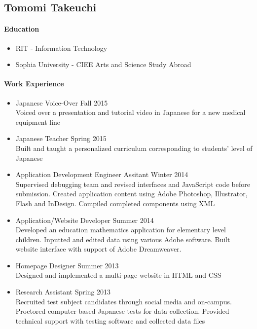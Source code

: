 \subsection{Tomomi Takeuchi}
	\paragraph{Education}
		\begin{itemize}
			\item RIT - Information Technology
			\item Sophia University - CIEE Arts and Science Study Abroad
		\end{itemize}
	\paragraph{Work Experience}
		\begin{itemize}
			\item Japanese Voice-Over \hfill Fall 2015\\
			Voiced over a presentation and tutorial video in Japanese for a new medical equipment line
			\item Japanese Teacher \hfill Spring 2015\\
			Built and taught a personalized curriculum corresponding to students' level of Japanese
			\item Application Development Engineer Assitant \hfill Winter 2014\\
			Supervised debugging team and revised interfaces and JavaScript code before submission. Created application content using Adobe Photoshop, Illustrator, Flash and InDesign. Compiled completed components using XML
			\item Application/Website Developer \hfill Summer 2014\\
			Developed an education mathematics application for elementary level children. Inputted and edited data using various Adobe software. Built website interface with support of Adobe Dreamweaver.
			\item Homepage Designer \hfill Summer 2013\\
			Designed and implemented a multi-page website in HTML and CSS
			\item Research Assistant \hfill Spring 2013\\
			Recruited test subject candidates through social media and on-campus. Proctored computer based Japanese tests for data-collection. Provided technical support with testing software and collected data files
		\end{itemize}
